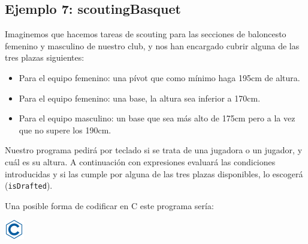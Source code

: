 \documentclass[
]{book}
\providecommand{\tightlist}{%
  \setlength{\itemsep}{0pt}\setlength{\parskip}{0pt}}
\begin{document}
\hypertarget{ejemplo-7-scoutingbasquet}{%
\subsection{Ejemplo 7: scoutingBasquet}\label{ejemplo-7-scoutingbasquet}}

Imaginemos que hacemos tareas de scouting para las secciones de baloncesto femenino y masculino de nuestro club, y nos han encargado cubrir alguna de las tres plazas siguientes:

\begin{itemize}
\tightlist
\item
  Para el equipo femenino: una pívot que como mínimo haga 195cm de altura.
\item
  Para el equipo femenino: una base, la altura sea inferior a 170cm.
\item
  Para el equipo masculino: un base que sea más alto de 175cm pero a la vez que no supere los 190cm.
\end{itemize}

Nuestro programa pedirá por teclado si se trata de una jugadora o un jugador, y cuál es su altura. A continuación con expresiones evaluará las condiciones introducidas y si las cumple por alguna de las tres plazas disponibles, lo escogerá (\texttt{isDrafted}).

Una posible forma de codificar en C este programa sería:

\includegraphics{./img/c.png}
\end{document}
